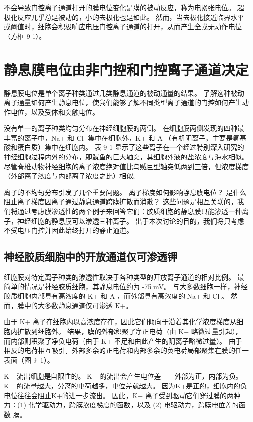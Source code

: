 不会导致门控离子通道打开的膜电位变化是膜的被动反应，称为电紧张电位。 
超极化反应几乎总是被动的，小的去极化也是如此。 
然而，当去极化接近临界水平或阈值时，细胞会积极响应电压门控离子通道的打开，从而产生全或无动作电位（方框 9-1）。



\section{静息膜电位由非门控和门控离子通道决定}
静息膜电位是单个离子种类通过几类静息通道的被动通量的结果。 
了解这种被动离子通量如何产生静息电位，使我们能够了解不同类型离子通道的门控如何产生动作电位，以及受体和突触电位。


没有单一的离子种类均匀分布在神经细胞膜的两侧。 
在细胞膜两侧发现的四种最丰富的离子中，Na+ 和 Cl- 集中在细胞外，K+ 和 A-（有机阴离子，主要是氨基酸和蛋白质）集中在细胞内。 
表 9-1 显示了这些离子在一个经过特别深入研究的神经细胞过程内外的分布，即鱿鱼的巨大轴突，其细胞外液的盐浓度与海水相似。 
尽管脊椎动物神经细胞的离子浓度绝对值比乌贼巨型轴突低两到三倍，但浓度梯度（外部离子浓度与内部离子浓度之比）相似。


离子的不均匀分布引发了几个重要问题。 
离子梯度如何影响静息膜电位？ 
是什么阻止离子梯度因离子通过静息通道跨膜扩散而消散？ 
这些问题是相互关联的，我们将通过考虑膜渗透性的两个例子来回答它们：胶质细胞的静息膜只能渗透一种离子，神经细胞的静息膜可以渗透三种离子。 
出于本次讨论的目的，我们将只考虑不受电压门控并因此始终打开的静止通道。






\subsection{神经胶质细胞中的开放通道仅可渗透钾}
细胞膜对特定离子种类的渗透性取决于各种类型的开放离子通道的相对比例。 
最简单的情况是神经胶质细胞，其静息电位约为 -75 mV。 
与大多数细胞一样，神经胶质细胞内部具有高浓度的 K+ 和 A-，而外部具有高浓度的 Na+ 和 Cl-。 
然而，膜中的大多数静息通道仅可渗透 K+。


由于 K+ 离子在细胞内以高浓度存在，因此它们倾向于沿着其化学浓度梯度从细胞内扩散到细胞外。 
结果，膜的外部积聚了净正电荷（由 K+ 略微过量引起），而内部则积聚了净负电荷（由于 K+ 不足和由此产生的阴离子略微过量）。 
由于相反的电荷相互吸引，外部多余的正电荷和内部多余的负电荷局部聚集在膜的任一表面（图 9–1）。


K+ 流出细胞是自限性的。 
K+ 的流出会产生电位差——外部为正，内部为负。 
K+ 的流量越大，分离的电荷越多，电位差就越大。 
因为K+是正的，细胞内的负电位往往会阻止K+的进一步流出。 
因此，K+ 离子受到驱动它们穿过膜的两种力：(1) 化学驱动力，跨膜浓度梯度的函数，以及 (2) 电驱动力，跨膜电位差的函数 膜。


